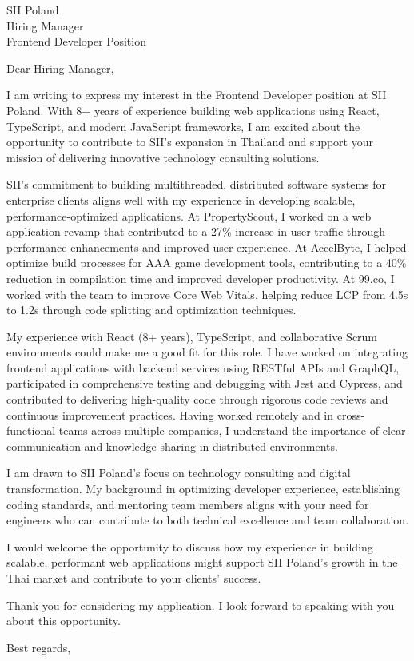 \documentclass[11pt]{letter}
\begin{document}
\begin{letter}{SII Poland \\ Hiring Manager \\ Frontend Developer Position}

\opening{Dear Hiring Manager,}

I am writing to express my interest in the Frontend Developer position at SII Poland. With 8+ years of experience building web applications using React, TypeScript, and modern JavaScript frameworks, I am excited about the opportunity to contribute to SII's expansion in Thailand and support your mission of delivering innovative technology consulting solutions.

SII's commitment to building multithreaded, distributed software systems for enterprise clients aligns well with my experience in developing scalable, performance-optimized applications. At PropertyScout, I worked on a web application revamp that contributed to a 27\% increase in user traffic through performance enhancements and improved user experience. At AccelByte, I helped optimize build processes for AAA game development tools, contributing to a 40\% reduction in compilation time and improved developer productivity. At 99.co, I worked with the team to improve Core Web Vitals, helping reduce LCP from 4.5s to 1.2s through code splitting and optimization techniques.

My experience with React (8+ years), TypeScript, and collaborative Scrum environments could make me a good fit for this role. I have worked on integrating frontend applications with backend services using RESTful APIs and GraphQL, participated in comprehensive testing and debugging with Jest and Cypress, and contributed to delivering high-quality code through rigorous code reviews and continuous improvement practices. Having worked remotely and in cross-functional teams across multiple companies, I understand the importance of clear communication and knowledge sharing in distributed environments.

I am drawn to SII Poland's focus on technology consulting and digital transformation. My background in optimizing developer experience, establishing coding standards, and mentoring team members aligns with your need for engineers who can contribute to both technical excellence and team collaboration.

I would welcome the opportunity to discuss how my experience in building scalable, performant web applications might support SII Poland's growth in the Thai market and contribute to your clients' success.

Thank you for considering my application. I look forward to speaking with you about this opportunity.

\closing{Best regards,}

\end{letter}
\end{document}
